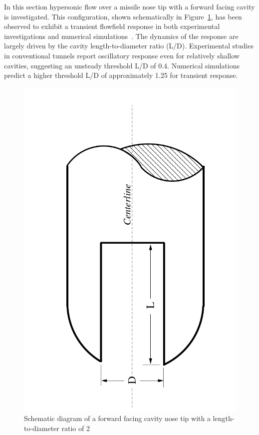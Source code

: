 In this section hypersonic flow over a missile nose tip with a forward facing cavity is investigated.  This configuration, shown schematically in Figure~\ref{fig:cavity_LD2_schematic}, has been observed to exhibit a transient flowfield response in both experimental investigations and numerical simulations~\cite{engblom_goldstein_AIAA-1996-667,engblom_goldstein_AIAA-1996-354,silton_goldstein_JTHPHT}.  The dynamics of the response are largely driven by the cavity length-to-diameter ratio (L/D).  Experimental studies in conventional tunnels report oscillatory response even for relatively shallow cavities, suggesting an unsteady threshold L/D of 0.4. Numerical simulations predict a higher threshold L/D of approximately 1.25 for transient response.
\begin{figure}[hbtp]
  \begin{center}
    \includegraphics[angle=270,width=\textwidth]{figures/sphere_cavity/LD_2.0/schematic}
    \caption{Schematic diagram of a forward facing cavity nose tip with a length-to-diameter ratio of 2\label{fig:cavity_LD2_schematic}}
  \end{center}
\end{figure}

